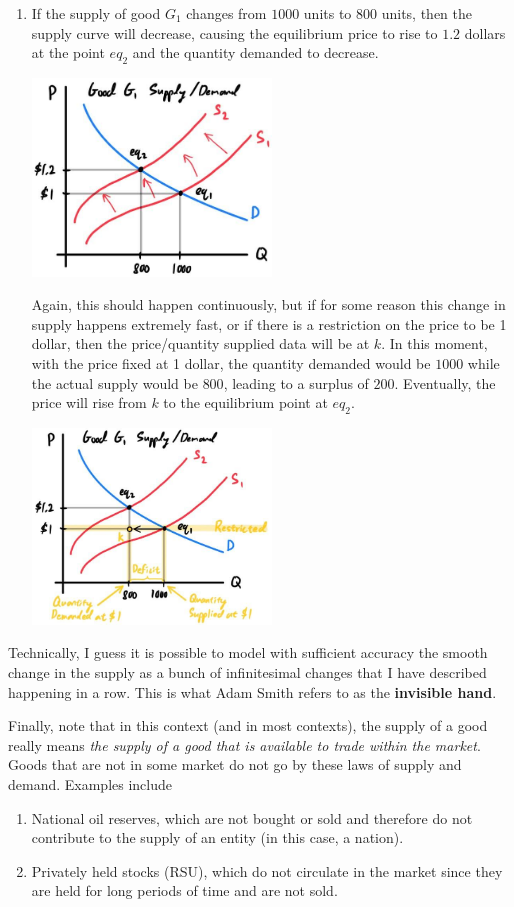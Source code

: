 \documentclass{article}
\begin{document}
\begin{enumerate}
      \item If the supply of good $G_1$ changes from $1000$ units to $800$ units, then the supply curve will decrease, causing the equilibrium price to rise to $1.2$ dollars at the point $eq_2$ and the quantity demanded to decrease.
      \begin{center}
        \includegraphics[width=0.5\textwidth]{img/Supply_Dec.jpg}
      \end{center}
      Again, this should happen continuously, but if for some reason this change in supply happens extremely fast, or if there is a restriction on the price to be 1 dollar, then the price/quantity supplied data will be at $k$. In this moment, with the price fixed at 1 dollar, the quantity demanded would be $1000$ while the actual supply would be $800$, leading to a surplus of $200$. Eventually, the price will rise from $k$ to the equilibrium point at $eq_2$.
      \begin{center}
        \includegraphics[width=0.5\textwidth]{img/Supply_Dec_2.jpg}
      \end{center}
    \end{enumerate}
    Technically, I guess it is possible to model with sufficient accuracy the smooth change in the supply as a bunch of infinitesimal changes that I have described happening in a row. This is what Adam Smith refers to as the \textbf{invisible hand}.

    Finally, note that in this context (and in most contexts), the supply of a good really means \textit{the supply of a good that is available to trade within the market}. Goods that are not in some market do not go by these laws of supply and demand. Examples include
    \begin{enumerate}
      \item National oil reserves, which are not bought or sold and therefore do not contribute to the supply of an entity (in this case, a nation).
      \item Privately held stocks (RSU), which do not circulate in the market since they are held for long periods of time and are not sold.
    \end{enumerate}
\end{document}
